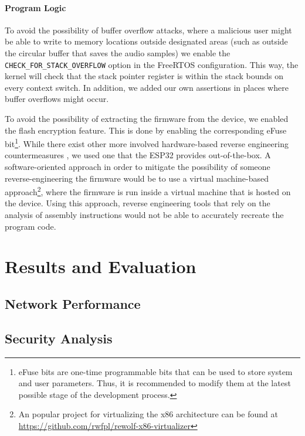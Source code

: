 \documentclass[conference]{IEEEtran}
\begin{document}
\paragraph{Program Logic}

To avoid the possibility of buffer overflow attacks, where a malicious user might be able 
to write to memory locations outside designated areas (such as outside the circular buffer that saves
the audio samples) we enable the \texttt{CHECK\_FOR\_STACK\_OVERFLOW} option in the FreeRTOS configuration.
This way, the kernel will check that the stack pointer register is within the stack bounds on every context switch.
In addition, we added our own assertions in places where buffer overflows might occur.

To avoid the possibility of extracting the firmware from the device,
we enabled the flash encryption feature. This is done by enabling the
corresponding eFuse bit\footnote{eFuse bits are one-time programmable bits that
can be used to store system and user parameters. Thus, it is recommended to
modify them at the latest possible stage of the development process.}. While
there exist other more involved hardware-based reverse engineering
countermeasures \cite{HardwareReverseEngineering}, we used one that the ESP32
provides out-of-the-box.
A software-oriented approach in order to mitigate the possibility of someone reverse-engineering the firmware would be to use
a virtual machine-based approach\footnote{An popular project for virtualizing the x86 architecture can be found at \url{https://github.com/rwfpl/rewolf-x86-virtualizer}},
where the firmware is run inside a virtual machine that is hosted on the device.
Using this approach, reverse engineering tools that rely on the analysis of
assembly instructions would not be able to accurately recreate the program
code.

\section{Results and Evaluation}

\subsection{Network Performance}



\subsection{Security Analysis}
\end{document}
